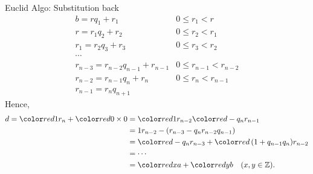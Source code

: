 \begin{frame}{Euclid Algo: Substitution back}
$$
    \begin{array}{ll}
    b=r q_1+r_1 & 0 \leqslant r_1<r \\
    r=r_1 q_2+r_2 & 0 \leqslant r_2<r_1 \\
    r_1=r_2 q_3+r_3 & 0 \leqslant r_3<r_2 \\
    \cdots & \\
    r_{n-3}=r_{n-2} q_{n-1}+r_{n-1} & 0 \leqslant r_{n-1}<r_{n-2} \\
    r_{n-2}=r_{n-1} q_n+r_n & 0 \leqslant r_n<r_{n-1} \\
    r_{n-1}=r_n q_{n+1} &
    \end{array}
    $$
    Hence, 
    $$
     \begin{aligned}
    d=\red{1} r_n + \red{0}\times 0 & =\red{1}r_{n-2}\red{-q_n} r_{n-1}  \\
    & \small =1 r_{n-2}-\left(r_{n-3}-q_n r_{n-2} q_{n-1}\right)  \\
    & =\red{-q_n} r_{n-3}+\red{\left(1+q_{n-1} q_n\right)} r_{n-2} \\
    & =\cdots \\
    & =\red{x} a+\red{y} b \quad(x, y \in \mathbb{Z}) .
    \end{aligned}
    $$
\end{frame}

